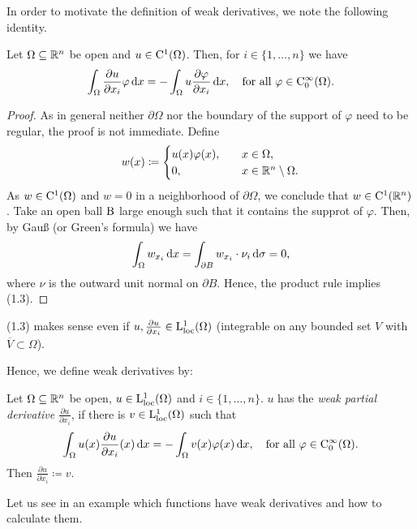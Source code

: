 In order to motivate the definition of weak derivatives, we note the following identity.

\begin{lem}
  Let $\Omega \subseteq \mathbb{R}^n$ be open and $u \in \mathrm{C}^1(\Omega)$. 
  Then, for $i \in \{1,\dots,n\}$ we have
  \begin{equation}
    \int_\Omega \frac{\partial u}{\partial x_i} \varphi \, {\operatorname{d}\!{x}} = -\int_\Omega u \frac{\partial \varphi}{\partial x_i} \, {\operatorname{d}\!{x}}, \quad \text{for all } \varphi \in \mathrm{C}_0^\infty(\Omega).
  \end{equation}
\end{lem}
\begin{proof}
  As in general neither $\partial \Omega$ nor the boundary of the support of $\varphi$ need to be regular, the proof is not immediate.
  Define
  $$
  w(x) \coloneqq  \begin{cases} u(x) \varphi(x), \quad &x \in \Omega, \\
    0, \quad &x \in \mathbb{R}^n \setminus \Omega .\end{cases}
  $$
  As $w \in \mathrm{C}^1(\Omega)$ and $w = 0$ in a neighborhood of $\partial \Omega$, we conclude that $w \in \mathrm{C}^1(\mathbb{R}^n)$.
  Take an open ball $\mathrm{B}$ large enough such that it contains the supprot of $\varphi$. 
  Then, by Gauß (or Green's formula) we have
  $$
  \int_\Omega w_{x_i} \, {\operatorname{d}\!{x}} 
  = \int_{\partial B} w_{x_i} \cdot \nu_i \, {\operatorname{d}\!{\sigma}} = 0,
  $$
  where $\nu$ is the outward unit normal on $\partial B$.
  Hence, the product rule implies (1.3).
\end{proof}
(1.3) makes sense even if $u, \frac{\partial u}{\partial x_i} \in \mathrm{L}_{\operatorname{loc}}^1(\Omega)$ (integrable on any bounded set $V$ with $\overline V \subset \Omega$).

Hence, we define weak derivatives by:

\begin{defn}
  Let $\Omega \subseteq \mathbb{R}^n$ be open, $u \in \mathrm{L}_{\operatorname{loc}}^1(\Omega)$ and $i \in \{1,\dots,n\}$.
  $u$ has the \emph{weak partial derivative} $\frac{\partial u}{\partial x_i}$, if there is $v \in \mathrm{L}_{\operatorname{loc}}^1(\Omega)$ such that
  \begin{equation}
    \int_\Omega u(x) \frac{\partial u}{\partial x_i}(x) \, {\operatorname{d}\!{x}} = -\int_\Omega v(x) \varphi(x) \, {\operatorname{d}\!{x}}, \quad \text{for all } \varphi \in \mathrm{C}_0^\infty(\Omega).    
  \end{equation}
  Then $\frac{\partial u}{\partial x_i} \coloneqq v$.
\end{defn}

Let us see in an example which functions have weak derivatives and how to calculate them.


